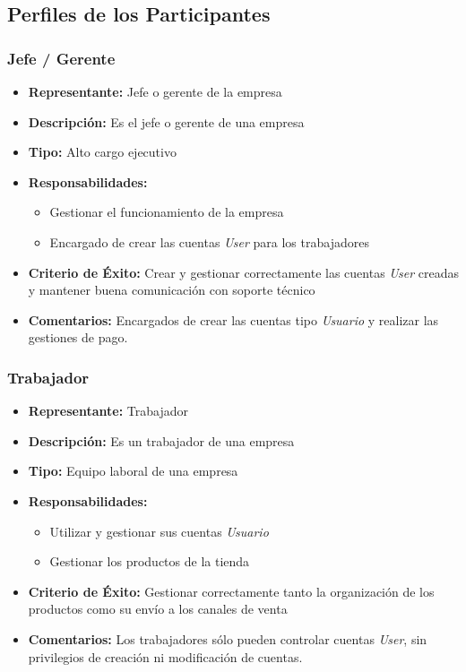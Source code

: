 \documentclass{article}
\begin{document}
\subsection{Perfiles de los Participantes}

\subsubsection{Jefe / Gerente}

\begin{itemize}
    \item \textbf{Representante:} Jefe o gerente de la empresa
    \item \textbf{Descripción:} Es el jefe o gerente de una empresa
    \item \textbf{Tipo:} Alto cargo ejecutivo
    \item \textbf{Responsabilidades:}
    \begin{itemize}
        \item Gestionar el funcionamiento de la empresa
        \item Encargado de crear las cuentas \textit{User} para los trabajadores
    \end{itemize}
    \item \textbf{Criterio de Éxito:} Crear y gestionar correctamente las cuentas \textit{User} creadas y mantener buena comunicación con soporte técnico
    \item \textbf{Comentarios:} Encargados de crear las cuentas tipo \textit{Usuario} y realizar las gestiones de pago.
\end{itemize}

\subsubsection{Trabajador}

\begin{itemize}
    \item \textbf{Representante:} Trabajador
    \item \textbf{Descripción:} Es un trabajador de una empresa
    \item \textbf{Tipo:} Equipo laboral de una empresa
    \item \textbf{Responsabilidades:}
    \begin{itemize}
        \item Utilizar y gestionar sus cuentas \textit{Usuario}
        \item Gestionar los productos de la tienda
    \end{itemize}
    \item \textbf{Criterio de Éxito:} Gestionar correctamente tanto la organización de los productos como su envío a los canales de venta
    \item \textbf{Comentarios:} Los trabajadores sólo pueden controlar cuentas \textit{User}, sin privilegios de creación ni modificación de cuentas.
\end{itemize}
\end{document}
